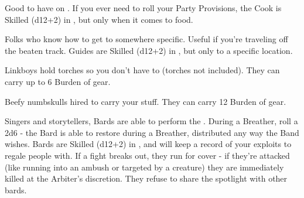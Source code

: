     Good to have on .  If you ever need to roll your Party Provisions, the Cook is Skilled (d12+2) in , but only when it comes to food.


    Folks who know how to get to somewhere specific. Useful if you're traveling off the beaten track. Guides are Skilled (d12+2) in , but only to a specific location.



    Linkboys hold torches so you don't have to (torches not included). They can carry up to 6 Burden of gear.


    Beefy numbskulls hired to carry your stuff. They can carry 12 Burden of gear.






    Singers and storytellers, Bards are able to perform the . During a Breather, roll a 2d6 - the Bard is able to restore \SUM {} during a Breather, distributed any way the Band wishes. Bards are Skilled (d12+2) in , and will keep a record of your exploits to regale people with.  If a fight breaks out, they run for cover - if they're attacked (like running into an ambush or targeted by a creature) they are immediately killed at the Arbiter's discretion.  They refuse to share the spotlight with other bards.

